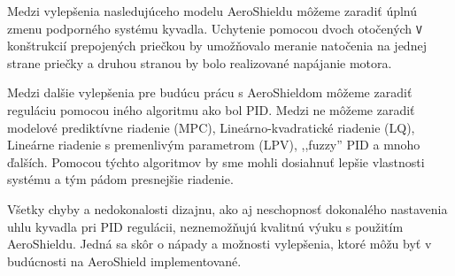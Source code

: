 Medzi vylepšenia nasledujúceho modelu AeroShieldu môžeme zaradiť úplnú zmenu podporného systému kyvadla. Uchytenie pomocou dvoch otočených \verb|V| konštrukcií prepojených priečkou by umožňovalo meranie natočenia na jednej strane priečky a druhou stranou by bolo realizované napájanie motora.   

Medzi dalšie vylepšenia pre budúcu prácu s AeroShieldom môžeme zaradiť reguláciu pomocou iného algoritmu ako bol PID. Medzi ne môžeme zaradiť modelové prediktívne riadenie (MPC), Lineárno-kvadratické riadenie (LQ), Lineárne riadenie s premenlivým parametrom (LPV), ,,fuzzy'' PID a mnoho ďalších. Pomocou týchto algoritmov by sme mohli dosiahnuť lepšie vlastnosti systému a tým pádom presnejšie riadenie. 

Všetky chyby a nedokonalosti dizajnu, ako aj neschopnosť dokonalého nastavenia uhlu kyvadla pri PID regulácii,
neznemožňujú kvalitnú výuku s použitím AeroShieldu. Jedná sa skôr o nápady a možnosti vylepšenia, ktoré môžu byť v budúcnosti na AeroShield implementované.